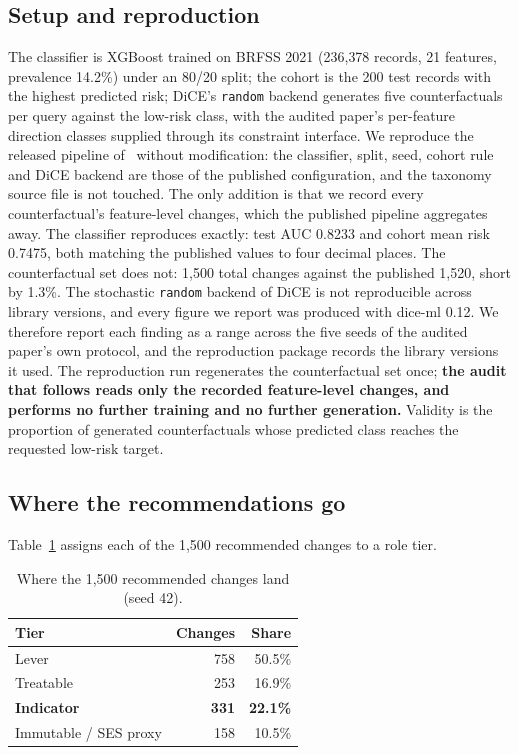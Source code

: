 \documentclass[conference]{IEEEtran}
\begin{document}
\subsection{Setup and reproduction}
The classifier is XGBoost trained on BRFSS 2021 (236{,}378 records, 21 features, prevalence 14.2\%) under an 80/20 split; the cohort is the 200 test records with the highest predicted risk; DiCE's \texttt{random} backend generates five counterfactuals per query against the low-risk class, with the audited paper's per-feature direction classes supplied through its constraint interface. We reproduce the released pipeline of~\cite{thieu2026} without modification: the classifier, split, seed, cohort rule and DiCE backend are those of the published configuration, and the taxonomy source file is not touched. The only addition is that we record every counterfactual's feature-level changes, which the published pipeline aggregates away. The classifier reproduces exactly: test AUC 0.8233 and cohort mean risk 0.7475, both matching the published values to four decimal places. The counterfactual set does not: 1{,}500 total changes against the published 1{,}520, short by 1.3\%. The stochastic \texttt{random} backend of DiCE is not reproducible across library versions, and every figure we report was produced with dice-ml 0.12. We therefore report each finding as a range across the five seeds of the audited paper's own protocol, and the reproduction package records the library versions it used. The reproduction run regenerates the counterfactual set once; \textbf{the audit that follows reads only the recorded feature-level changes, and performs no further training and no further generation.} Validity is the proportion of generated counterfactuals whose predicted class reaches the requested low-risk target.

\subsection{Where the recommendations go}
Table~\ref{tab:audit} assigns each of the 1{,}500 recommended changes to a role tier.

\begin{table}[t]
\caption{Where the 1{,}500 recommended changes land (seed 42).}
\label{tab:audit}
\centering
\footnotesize
\begin{tabular}{@{}lrr@{}}
\toprule
\textbf{Tier} & \textbf{Changes} & \textbf{Share} \\
\midrule
Lever & 758 & 50.5\% \\
Treatable & 253 & 16.9\% \\
\textbf{Indicator} & \textbf{331} & \textbf{22.1\%} \\
Immutable / SES proxy & 158 & 10.5\% \\
\bottomrule
\end{tabular}
\end{table}
\end{document}
